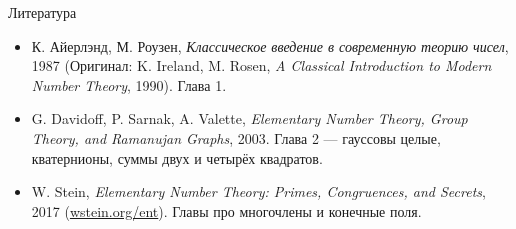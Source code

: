 \documentclass[serif, aspectratio=169]{beamer}
\begin{document}
\begin{frame}{Литература}
    \begin{itemize}[<.->]
        \item К. Айерлэнд, М. Роузен, \textit{Классическое введение в современную теорию чисел}, 1987 (Оригинал: K. Ireland, M. Rosen, \textit{A Classical Introduction to Modern Number Theory}, 1990). Глава 1.
        \item G. Davidoff, P. Sarnak, A. Valette, \textit{Elementary Number Theory, Group Theory, and Ramanujan Graphs}, 2003. Глава 2 --- гауссовы целые, кватернионы, суммы двух и четырёх квадратов.
        \item W. Stein, \textit{Elementary Number Theory: Primes, Congruences, and Secrets}, 2017 (\href{https://wstein.org/ent}{wstein.org/ent}). Главы про многочлены и конечные поля.
    \end{itemize}
\end{frame}
\end{document}
